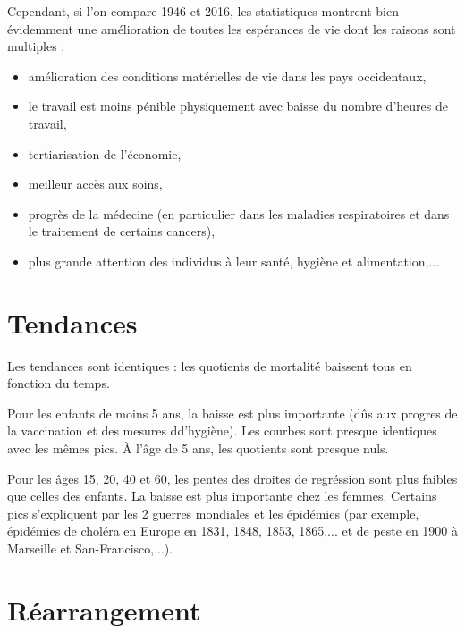 \documentclass{article}
\begin{document}
\vspace{0.4cm}

\noindent Cependant, si l'on compare 1946 et 2016, les statistiques montrent bien évidemment une amélioration de toutes les espérances de vie dont les raisons sont multiples :

\begin{itemize}
\item amélioration des conditions matérielles de vie dans les pays occidentaux,
\item le travail est moins pénible physiquement avec baisse du nombre d'heures de travail,
\item tertiarisation de l'économie,
\item meilleur accès aux soins,
\item progrès de la médecine (en particulier dans les maladies respiratoires et dans le traitement de certains cancers),
\item plus grande attention des individus à leur santé, hygiène et alimentation,...
\end{itemize}


\section{Tendances}

\noindent Les tendances sont identiques : les quotients de mortalité baissent tous en fonction du temps.

\vspace{0.4cm}

\noindent Pour les enfants de moins 5 ans, la baisse est plus importante (dûs aux progres de la vaccination et des mesures dd'hygiène). Les courbes sont presque identiques avec les mêmes pics. \`A l'âge de 5 ans, les quotients sont presque nuls.

\vspace{0.4cm}

\noindent Pour les âges 15, 20, 40 et 60, les pentes des droites de regréssion sont plus faibles que celles des enfants. La baisse est plus importante chez les femmes. Certains pics s'expliquent par les 2 guerres mondiales et les épidémies (par exemple, épidémies de choléra en Europe en 1831, 1848, 1853, 1865,... et de peste en 1900 à Marseille et San-Francisco,...).

\section{Réarrangement}
\end{document}
